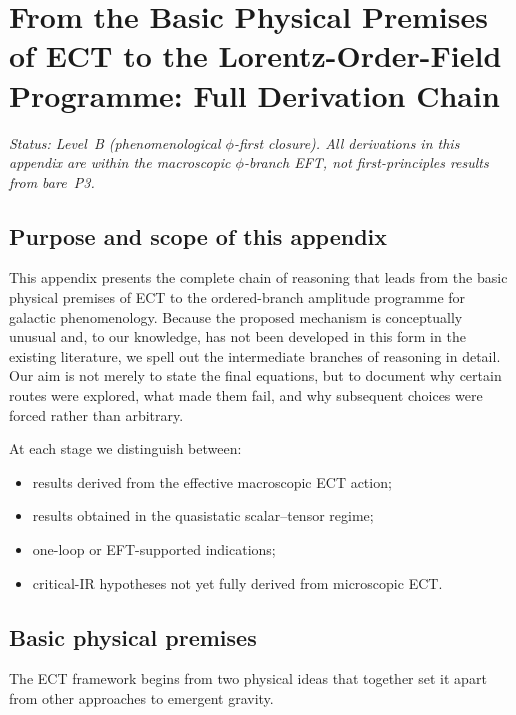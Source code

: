 \documentclass[11pt,a4paper]{article}
\numberwithin{equation}{section}
\begin{document}
\section{From the Basic Physical Premises of ECT to the
Lorentz-Order-Field Programme: Full Derivation Chain}
\label{app:lof_full_derivation}

\textit{Status: Level~B (phenomenological $\phi$-first closure).
All derivations in this appendix are within the macroscopic
$\phi$-branch EFT, not first-principles results from bare~P3.}



\subsection{Purpose and scope of this appendix}

This appendix presents the complete chain of reasoning that
leads from the basic physical premises of ECT to the
ordered-branch amplitude programme for galactic phenomenology.
Because the proposed mechanism is conceptually unusual and,
to our knowledge, has not been developed in this form in the
existing literature, we spell out the intermediate branches
of reasoning in detail. Our aim is not merely to state the
final equations, but to document why certain routes were
explored, what made them fail, and why subsequent choices
were forced rather than arbitrary.

At each stage we distinguish between:
\begin{itemize}
\item results derived from the effective macroscopic ECT action;
\item results obtained in the quasistatic scalar--tensor regime;
\item one-loop or EFT-supported indications;
\item critical-IR hypotheses not yet fully derived from
  microscopic ECT.
\end{itemize}


\subsection{Basic physical premises}
\label{app:lof:premises}

The ECT framework begins from two physical ideas that together
set it apart from other approaches to emergent gravity.
\end{document}
